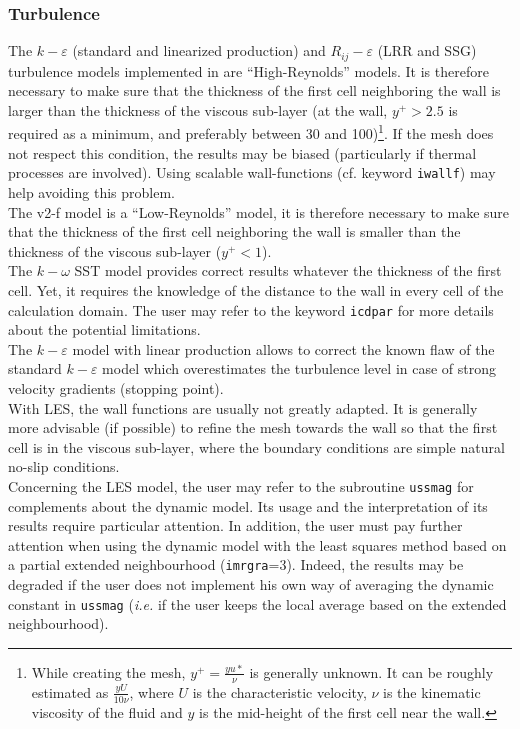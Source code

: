 \subsubsection{Turbulence}

The $k-\varepsilon$ (standard and linearized production) and $R_{ij}-\varepsilon$
(LRR and SSG) turbulence
models implemented in \CS are ``High-Reynolds'' models. It is therefore
necessary to make sure that the thickness of the first cell neighboring
the wall is larger than the thickness of the viscous sub-layer (at the
wall, $y^+>2.5$ is required as a minimum, and preferably between 30 and
100)\footnote{While creating the mesh, $y^+=\frac{yu*}{\nu}$ is
generally unknown. It can be roughly estimated as $\frac{yU}{10\nu}$, where
$U$ is the characteristic velocity, $\nu$ is the kinematic viscosity of the fluid
 and $y$ is the mid-height of the first cell near the wall.}. If the mesh does
 not respect this condition, the results may be biased
(particularly if thermal processes are involved). Using scalable wall-functions
(cf. keyword {\tt iwallf}) may help avoiding this problem.\\
The v2-f model is a ``Low-Reynolds'' model, it is therefore necessary to
make sure that the thickness of the first cell neighboring the wall is
smaller than the thickness of the viscous sub-layer ($y^+<1$).\\
The $k-\omega$ SST model provides correct results whatever the thickness of the first cell.
Yet, it requires the knowledge of the distance to the wall in every
cell of the calculation domain. The user may refer to the keyword
{\tt icdpar} for more details about the potential limitations.\\
The $k-\varepsilon$ model with linear production allows to correct the
known flaw of the standard $k-\varepsilon$ model which overestimates the
turbulence level in case of strong velocity gradients (stopping point).\\
With LES, the wall functions are usually not greatly adapted. It is generally more advisable
(if possible) to refine the mesh towards the wall so that the first cell is in the
viscous sub-layer, where the boundary conditions are simple natural no-slip conditions.\\
Concerning the LES model, the user may refer to the subroutine
\texttt{ussmag} for complements about the dynamic model. Its usage
and the interpretation of its results require particular attention.
In addition, the user must pay further attention when using the dynamic
model with the least squares method based on a partial extended
neighbourhood ({\tt imrgra}=3). Indeed, the results may be degraded if the user
does not implement his own way of averaging the dynamic constant in
\texttt{ussmag} (\textit{i.e.} if the user keeps the local average based
on the extended neighbourhood).\\

